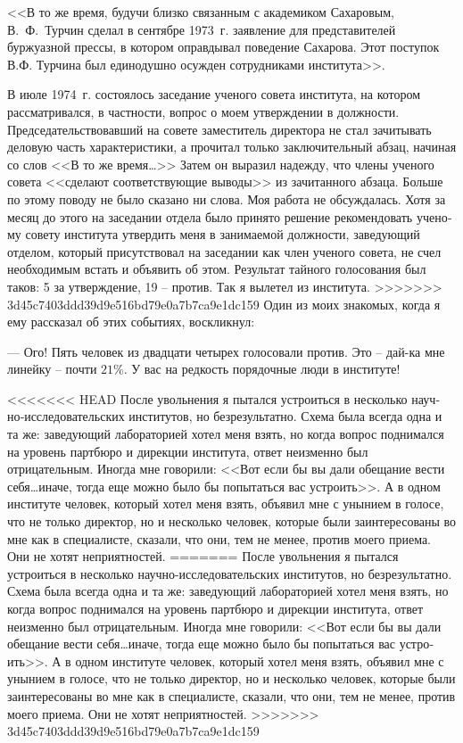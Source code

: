 \documentclass{book}
\begin{document}
<<В то же время, будучи близко связанным с академиком Сахаровым, В.~Ф.~Турчин сделал в сентябре 1973~г. заявление для представителей буржуазной прессы, в котором оправды­вал поведение Сахарова. Этот поступок В.Ф. Турчина был еди­нодушно осужден сотрудниками института>>.

В июле 1974~г. состоялось заседание ученого совета инсти­тута, на котором рассматривался, в частности, вопрос о моем утверждении в должности. Председательствовавший на совете заместитель директора не стал зачитывать деловую часть харак­теристики, а прочитал только заключительный абзац, начиная со слов <<В то же время\ldots>> Затем он выразил надежду, что члены ученого совета <<сделают соответствующие выводы>> из зачи­танного абзаца. Больше по этому поводу не было сказано ни слова. Моя работа не обсуждалась. Хотя за месяц до этого на заседании отдела было принято решение рекомендовать учено­му совету института утвердить меня в занимаемой должности, заведующий отделом, который присутствовал на заседании как член ученого совета, не счел необходимым встать и объя­вить об этом. Результат тайного голосования был таков: 5 за утверждение, 19 -- против. Так я вылетел из института.
>>>>>>> 3d45c7403ddd39d9e516bd79e0a7b7ca9e1dc159
Один из моих знакомых, когда я ему рассказал об этих со­бытиях, воскликнул:

--- Ого! Пять человек из двадцати четырех голосовали про­тив. Это -- дай-ка мне линейку -- почти $21\%$. У вас на редкость порядочные люди в институте!

<<<<<<< HEAD
После увольнения я пытался устроиться в несколько науч­но‑исследовательских институтов, но безрезультатно. Схема была всегда одна и та же: заведующий лабораторией хотел меня взять, но когда вопрос поднимался на уровень партбюро и дирекции института, ответ неизменно был отрицательным. Иногда мне говорили: <<Вот если бы вы дали обещание вести себя\ldots иначе, тогда еще можно было бы попытаться вас устро­ить>>. А в одном институте человек, который хотел меня взять, объявил мне с унынием в голосе, что не только директор, но и несколько человек, которые были заинтересованы во мне как в специалисте, сказали, что они, тем не менее, против моего приема. Они не хотят неприятностей.
=======
После увольнения я пытался устроиться в несколько науч­но-исследовательских институтов, но безрезультатно. Схема была всегда одна и та же: заведующий лабораторией хотел меня взять, но когда вопрос поднимался на уровень партбюро и дирекции института, ответ неизменно был отрицательным. Иногда мне говорили: <<Вот если бы вы дали обещание вести себя\ldots иначе, тогда еще можно было бы попытаться вас устро­ить>>. А в одном институте человек, который хотел меня взять, объявил мне с унынием в голосе, что не только директор, но и несколько человек, которые были заинтересованы во мне как в специалисте, сказали, что они, тем не менее, против моего приема. Они не хотят неприятностей.
>>>>>>> 3d45c7403ddd39d9e516bd79e0a7b7ca9e1dc159
\end{document}

